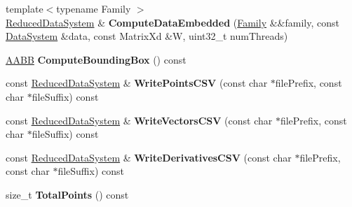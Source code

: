 \begin{DoxyCompactItemize}
\item 
\hypertarget{struct_d_r_d_s_p_1_1_reduced_data_system_a355ad1977811ebdf2924386c82c13f5c}{{\footnotesize template$<$typename Family $>$ }\\\hyperlink{struct_d_r_d_s_p_1_1_reduced_data_system}{Reduced\-Data\-System} \& {\bfseries Compute\-Data\-Embedded} (\hyperlink{struct_d_r_d_s_p_1_1_family}{Family} \&\&family, const \hyperlink{struct_d_r_d_s_p_1_1_data_system}{Data\-System} \&data, const Matrix\-Xd \&W, uint32\-\_\-t num\-Threads)}\label{struct_d_r_d_s_p_1_1_reduced_data_system_a355ad1977811ebdf2924386c82c13f5c}

\item 
\hypertarget{struct_d_r_d_s_p_1_1_reduced_data_system_a21853627f8229be7b5ec278faa31257e}{\hyperlink{struct_d_r_d_s_p_1_1_a_a_b_b}{A\-A\-B\-B} {\bfseries Compute\-Bounding\-Box} () const }\label{struct_d_r_d_s_p_1_1_reduced_data_system_a21853627f8229be7b5ec278faa31257e}

\item 
\hypertarget{struct_d_r_d_s_p_1_1_reduced_data_system_a97f0da184ef7de7c00fb2240aba8a80d}{const \hyperlink{struct_d_r_d_s_p_1_1_reduced_data_system}{Reduced\-Data\-System} \& {\bfseries Write\-Points\-C\-S\-V} (const char $\ast$file\-Prefix, const char $\ast$file\-Suffix) const }\label{struct_d_r_d_s_p_1_1_reduced_data_system_a97f0da184ef7de7c00fb2240aba8a80d}

\item 
\hypertarget{struct_d_r_d_s_p_1_1_reduced_data_system_afd34f28deedaa1e659f4c01b1d1baae5}{const \hyperlink{struct_d_r_d_s_p_1_1_reduced_data_system}{Reduced\-Data\-System} \& {\bfseries Write\-Vectors\-C\-S\-V} (const char $\ast$file\-Prefix, const char $\ast$file\-Suffix) const }\label{struct_d_r_d_s_p_1_1_reduced_data_system_afd34f28deedaa1e659f4c01b1d1baae5}

\item 
\hypertarget{struct_d_r_d_s_p_1_1_reduced_data_system_aec7390d62ee740bf632ab02609eb61f1}{const \hyperlink{struct_d_r_d_s_p_1_1_reduced_data_system}{Reduced\-Data\-System} \& {\bfseries Write\-Derivatives\-C\-S\-V} (const char $\ast$file\-Prefix, const char $\ast$file\-Suffix) const }\label{struct_d_r_d_s_p_1_1_reduced_data_system_aec7390d62ee740bf632ab02609eb61f1}

\item 
\hypertarget{struct_d_r_d_s_p_1_1_reduced_data_system_a0988fce584de39a969f21063198901c5}{size\-\_\-t {\bfseries Total\-Points} () const }\label{struct_d_r_d_s_p_1_1_reduced_data_system_a0988fce584de39a969f21063198901c5}


\end{DoxyCompactItemize}
